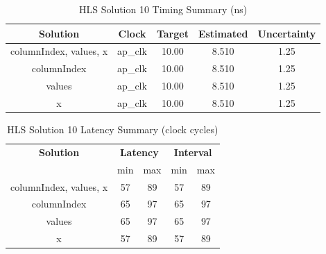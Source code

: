\begin{table}[H]
	\centering
	\begin{tabular}{|c|c|c|c|c|}
		\hline
		\textbf{Solution} & \textbf{Clock} & \textbf{Target} & \textbf{Estimated} & \textbf{Uncertainty} \\
		\hline
		columnIndex, values, x & ap\_clk & 10.00 & 8.510 & 1.25 \\
		\hline
		columnIndex & ap\_clk & 10.00 & 8.510 & 1.25 \\
		\hline
		values & ap\_clk & 10.00 & 8.510 & 1.25 \\
		\hline
		x & ap\_clk & 10.00 & 8.510 & 1.25 \\
		\hline
	\end{tabular}
	\caption{HLS Solution 10 Timing Summary (ns)}
	\label{tab:hls-solution-10-timing-summary}
\end{table}

\begin{table}[H]
	\centering
	\begin{tabular}{|c|c|c|c|c|}
		\hline
		\multicolumn{1}{|c|}{\textbf{Solution}} & \multicolumn{2}{|c|}{\textbf{Latency}} & \multicolumn{2}{|c|}{\textbf{Interval}} \\
		& min & max & min & max \\
		\hline
		columnIndex, values, x & 57 & 89 & 57 & 89 \\
		\hline
		columnIndex & 65 & 97 & 65 & 97 \\
		\hline
		values & 65 & 97 & 65 & 97 \\
		\hline
		x & 57 & 89 & 57 & 89 \\
		\hline
	\end{tabular}
	\caption{HLS Solution 10 Latency Summary (clock cycles)}
	\label{tab:hls-solution-10-latency-summary}
\end{table}

